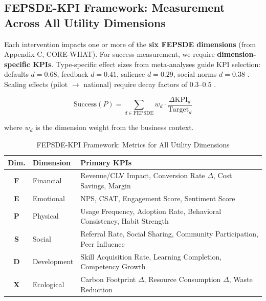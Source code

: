 \subsection{FEPSDE-KPI Framework: Measurement Across All Utility Dimensions}
\label{sec:hhh-fepsde-kpi}

\begin{tcolorbox}[colback=yellow!5!white, colframe=yellow!75!black,
    title=\textbf{Definition HHH-D7: FEPSDE-KPI Mapping}]

Each intervention impacts one or more of the \textbf{six FEPSDE dimensions} (from Appendix C, CORE-WHAT). For success measurement, we require \textbf{dimension-specific KPIs}. Type-specific effect sizes from meta-analyses guide KPI selection: defaults $d = 0.68$, feedback $d = 0.41$, salience $d = 0.29$, social norms $d = 0.38$ \citep{mertens2022choice}. Scaling effects (pilot $\to$ national) require decay factors of 0.3--0.5 \citep{soman2020successfully}.

\begin{equation}
\text{Success}(P) = \sum_{d \in \text{FEPSDE}} w_d \cdot \frac{\Delta \text{KPI}_d}{\text{Target}_d}
\end{equation}

where $w_d$ is the dimension weight from the business context.
\end{tcolorbox}

\begin{table}[htbp]
\centering
\caption{FEPSDE-KPI Framework: Metrics for All Utility Dimensions}
\label{tab:hhh-fepsde-kpi}
\renewcommand{\arraystretch}{1.3}
\footnotesize
\begin{tabular}{@{}clp{5cm}@{}}
\toprule
\textbf{Dim.} & \textbf{Dimension} & \textbf{Primary KPIs} \\
\midrule
\textbf{F} & Financial & Revenue/CLV Impact, Conversion Rate $\Delta$, Cost Savings, Margin \\
\textbf{E} & Emotional & NPS, CSAT, Engagement Score, Sentiment Score \\
\textbf{P} & Physical & Usage Frequency, Adoption Rate, Behavioral Consistency, Habit Strength \\
\textbf{S} & Social & Referral Rate, Social Sharing, Community Participation, Peer Influence \\
\textbf{D} & Development & Skill Acquisition Rate, Learning Completion, Competency Growth \\
\textbf{X} & Ecological & Carbon Footprint $\Delta$, Resource Consumption $\Delta$, Waste Reduction \\
\bottomrule
\end{tabular}
\end{table}

